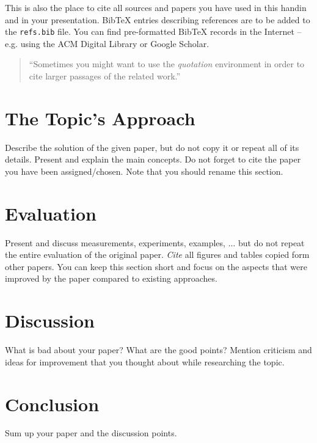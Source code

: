 \documentclass[a4paper,10pt,twoside]{article}
\begin{document}
This is also the place to cite all sources and papers you have used in this handin and in your presentation. 
Bib\TeX$\!$ entries describing references are to be added to the \verb|refs.bib| file. 
You can find pre-formatted Bib\TeX$\!$ records in the Internet -- e.g. using the ACM Digital Library or Google Scholar.

\begin{quotation}
	``Sometimes you might want to use the \emph{quotation} environment in order to cite larger passages of the related work.''
\end{quotation}

\section{The Topic's Approach}

Describe the solution of the given paper, but do not copy it or repeat all of its details.
Present and explain the main concepts. 
Do not forget to cite the paper~\cite{mainpaper} you have been assigned/chosen.
Note that you should rename this section.

\section{Evaluation}

Present and discuss measurements, experiments, examples, ... but do not repeat the entire evaluation of the original paper.
\emph{Cite} all figures and tables copied form other papers.
You can keep this section short and focus on the aspects that were improved by the paper compared to existing approaches.

\section{Discussion}

What is bad about your paper? 
What are the good points? 
Mention criticism and ideas for improvement that you thought about while researching the topic.

\section{Conclusion}

Sum up your paper and the discussion points.


 
\end{document}
